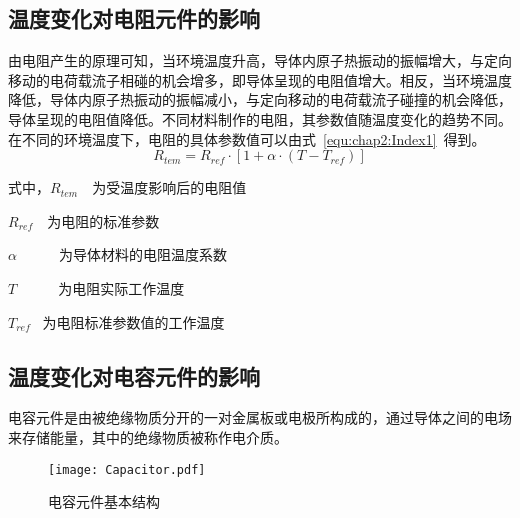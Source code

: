 \subsection{温度变化对电阻元件的影响}
由电阻产生的原理可知，当环境温度升高，导体内原子热振动的振幅增大，与定向移动的电荷载流子相碰的机会增多，即导体呈现的电阻值增大。相反，当环境温度降低，导体内原子热振动的振幅减小，与定向移动的电荷载流子碰撞的机会降低，导体呈现的电阻值降低。不同材料制作的电阻，其参数值随温度变化的趋势不同。在不同的环境温度下，电阻的具体参数值可以由式~\ref{equ:chap2:Index1}~得到。
\begin{equation}\label{equ:chap2:Index1}
  R_{tem}=R_{ref}\cdot\left[1+\alpha\cdot\left(T-T_{ref}\right)\right]
\end{equation}

式中，$R_{tem}$~~为受温度影响后的电阻值

\hspace{1.3cm}$R_{ref}$~~为电阻的标准参数

\hspace{1.3cm}$\alpha$~~~~~~为导体材料的电阻温度系数

\hspace{1.3cm}$T$~~~~~~为电阻实际工作温度

\hspace{1.3cm}$T_{ref}$ ~为电阻标准参数值的工作温度
\iffalse
\begin{table}[htbp]    %
      \begin{tabular}{C{1cm}p{0.5cm}p{7cm}}
                             & $R_{tem}$     &为受温度影响后的电阻值\\

                             & $R_{ref}$      & 为电阻的标准参数\\

                            & $\alpha$         &为导体材料的电阻温度系数\\

                            & $T$                 &为电阻实际工作温度\\

                            & $T_{ref}$       &为电阻标准参数值的工作温度\\
\end{tabular}
\end{table}
\fi
\subsection{温度变化对电容元件的影响}
电容元件是由被绝缘物质分开的一对金属板或电极所构成的，通过导体之间的电场来存储能量，其中的绝缘物质被称作电介质。
\begin{figure}[h]
  \centering
     \texttt{[image: Capacitor.pdf]}\\
   \caption{电容元件基本结构}\label{fig:chap2:capacitor}
\end{figure}

